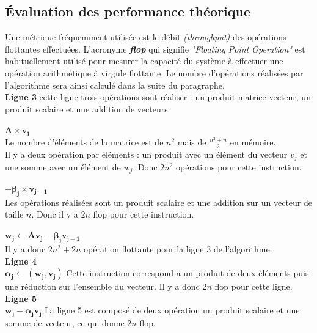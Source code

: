 \documentclass[11pt,french]{article}
\begin{document}
	\subsection{Évaluation des performance théorique}
	Une métrique fréquemment utilisée est le débit \emph{(throughput)} des opérations flottantes effectuées. L’acronyme \textbf{\emph{flop}} qui signifie \emph{"Floating Point Operation"} est habituellement utilisé pour mesurer la capacité du système à effectuer une opération arithmétique à virgule flottante. Le nombre d'opérations réalisées par l'algorithme sera ainsi calculé dans la suite du paragraphe.  \\

	\noindent \textbf{Ligne  3}
	cette ligne trois opérations sont réaliser : un produit matrice-vecteur, un produit scalaire et une addition de vecteurs. \\ \\
	$\boldsymbol{ A \times v_j}$\\
	Le nombre d’éléments de la matrice est de $n^2$ mais de $\frac{n^2 + n}{2}$  en mémoire.\\
	Il y a deux opération par éléments :  un produit avec un élément du vecteur  $v_j$ et une somme avec un élément de $w_j$.
	Donc $2n^2$ opérations pour cette instruction. \\ \\
	$\boldsymbol{ - \beta_j \times v_{j - 1}}$\\
	Les opérations réalisées sont un produit scalaire et une addition sur un vecteur de taille $n$.
	Donc il y a $2n$ flop pour cette instruction. \\  \\
	\noindent $\boldsymbol{w_j \gets Av_j - \beta_j  v_{j-1}}$ \\
	Il y a donc $2n^2 + 2n$ opération flottante pour la ligne 3 de l'algorithme.  \\
	
	\noindent \textbf{Ligne  4}\\
	$\boldsymbol {\alpha_j \gets (w_j,v_j)}$
	Cette instruction correspond a un produit de deux éléments puis une réduction sur l'ensemble du vecteur. Il y a donc $2n$ flop pour cette ligne. \\
	
	\noindent\textbf{Ligne  5}\\
	$\boldsymbol {w_j - \boldsymbol{\alpha_j} v_j}$
	La ligne 5 est composé de deux  opération un produit scalaire et une somme de vecteur, ce qui donne $2n$ flop. \\
	
\end{document}
